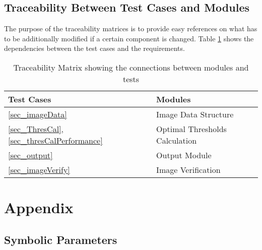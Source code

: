 \documentclass[12pt, titlepage]{article}
\begin{document}
\subsection{Traceability Between Test Cases and Modules}

The purpose of the traceability matrices is to provide easy references on what
has to be additionally modified if a certain component is changed. Table
\ref{Tb_trace} shows the
dependencies between the test cases and the requirements.

\begin{table}[h]
\centering
\begin{tabular}{@{}ll@{}}
\toprule
Test Cases & Modules \\ \midrule
\ref{sec_imageData} & Image Data Structure \\
\ref{sec_ThresCal}, \ref{sec_thresCalPerformance} & Optimal Thresholds
Calculation \\
\ref{sec_output} & Output Module \\
\ref{sec_imageVerify} & Image Verification \\ \bottomrule
\end{tabular}
\caption{Traceability Matrix showing the connections between modules and
tests}
\label{Tb_trace}
\end{table}

\newpage




\newpage

\section{Appendix}

\subsection{Symbolic Parameters}
\end{document}
